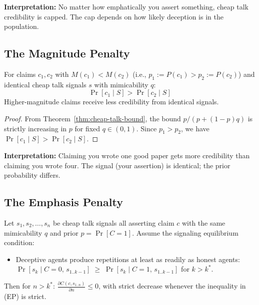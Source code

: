 \textbf{Interpretation:} No matter how emphatically you assert
something, cheap talk credibility is capped. The cap depends on how
likely deception is in the population.

\subsection{The Magnitude Penalty}\label{the-magnitude-penalty}

\begin{theorem}\label{thm:magnitude-penalty}
For claims $c_1, c_2$ with $M(c_1) < M(c_2)$ (i.e., $p_1 := P(c_1) > p_2 := P(c_2)$)
and identical cheap talk signals $s$ with mimicability $q$:
\[\Pr[c_1 \mid S] > \Pr[c_2 \mid S]\]
Higher-magnitude claims receive less credibility from identical signals.

 
\end{theorem}

\begin{proof}
From Theorem~\ref{thm:cheap-talk-bound}, the bound $p/(p+(1-p)q)$ is strictly
increasing in $p$ for fixed $q \in (0,1)$. Since $p_1 > p_2$, we have
$\Pr[c_1 \mid S] > \Pr[c_2 \mid S]$.
\end{proof}

\textbf{Interpretation:} Claiming you wrote one good paper gets more
credibility than claiming you wrote four. The signal (your assertion) is
identical; the prior probability differs.

\subsection{The Emphasis Penalty}\label{the-emphasis-penalty}

\begin{theorem}\label{thm:emphasis-penalty}
Let \(s_1, s_2, \ldots, s_n\) be cheap talk signals all asserting claim \(c\) with the
same mimicability $q$ and prior $p = \Pr[C=1]$. Assume the signaling equilibrium condition:
\begin{itemize}
\item[(EP)] Deceptive agents produce repetitions at least as readily as honest agents:
$\Pr[s_k \mid C{=}0,\, s_{1..k-1}] \;\geq\; \Pr[s_k \mid C{=}1,\, s_{1..k-1}]$ for $k > k^*$.
\end{itemize}
Then for $n > k^*$: $\frac{\partial C(c, s_{1..n})}{\partial n} \leq 0$, with strict decrease whenever
the inequality in (EP) is strict.

  
\end{theorem}

